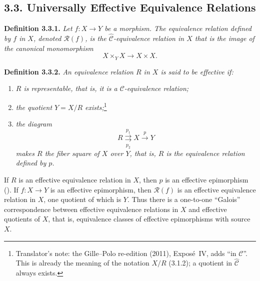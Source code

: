 \subsection*{3.3. Universally Effective Equivalence Relations}

\noindent{}\textbf{Definition 3.3.1.}
\textit{Let \(f:X\to Y\) be a morphism. The \emph{equivalence relation
defined by \(f\) in \(X\)}, denoted \(\mathscr R(f)\), is the
\(\widehat{\mathscr C}\)-equivalence relation in \(X\) that is the image of
the canonical monomorphism}
\[
  X\times_Y X\longrightarrow X\times X.
\]

\medskip
\noindent{}\textbf{Definition 3.3.2.}
\textit{An equivalence relation \(R\) in \(X\) is said to be
\emph{effective} if:}
\begin{enumerate}
  \item[(i)] \textit{\(R\) is representable, that is, it is a
  \(\mathscr C\)-equivalence relation;}
  \item[(ii)] \textit{the quotient \(Y=X/R\) exists;}\footnote{Translator's note: the Gille--Polo re-edition (2011), Expos\'e~IV, adds
``in \(\mathscr C\)''. This is already the meaning of the notation \(X/R\)
(3.1.2); a quotient in \(\widehat{\mathscr C}\) always exists.}
  \item[(iii)] \textit{the diagram}
  \[
    R\overset{p_1}{\underset{p_2}{\rightrightarrows}}
    X\xrightarrow{p}Y
  \]
  \textit{makes \(R\) the fiber square of \(X\) over \(Y\), that is,
  \(R\) is the equivalence relation defined by \(p\).}
\end{enumerate}

%
If \(R\) is an effective equivalence relation in \(X\), then \(p\)
is an effective epimorphism (). If \(f:X\to Y\) is an effective
epimorphism, then \(\mathscr R(f)\) is an effective equivalence relation in
\(X\), one quotient of which is \(Y\). Thus there is a one-to-one
``Galois'' correspondence between effective equivalence relations in \(X\)
and effective quotients of \(X\), that is, equivalence classes of effective
epimorphisms with source \(X\).

